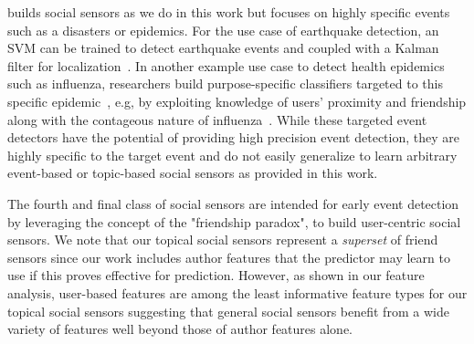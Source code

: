 \vspace{2mm}
 builds social sensors
as we do in this work but focuses on highly specific events 
such as a disasters or epidemics.  For the use case of earthquake
detection, an SVM can be trained to detect earthquake events
and coupled with a Kalman filter for localization~\cite{sakakiEq2}.
%
%
%
In another example use case to detect health epidemics such as
influenza, researchers build purpose-specific classifiers targeted to
this specific epidemic~\cite{culotta,aramaki}, e.g, by exploiting
knowledge of users' proximity and friendship along with the contageous
nature of influenza~\cite{sadilek}.  While these targeted event
detectors have the potential of providing high precision event
detection, they are highly specific to the target event and do not
easily generalize to learn arbitrary event-based or topic-based social
sensors as provided in this work.

\vspace{2mm}
The fourth and final class of social sensors are intended for early
event detection~\cite{sandy,garcia} by leveraging the concept of the
"friendship paradox"\cite{feld}, %
to build user-centric social sensors.  We note that our topical social
sensors represent a \emph{superset} of friend sensors since our work
includes author features that the predictor may learn to use if this
proves effective for prediction.  However, as shown in our feature
analysis, user-based features are among the least informative feature
types for our topical social sensors suggesting that general social
sensors benefit from a wide variety of features well beyond those of
author features alone.

